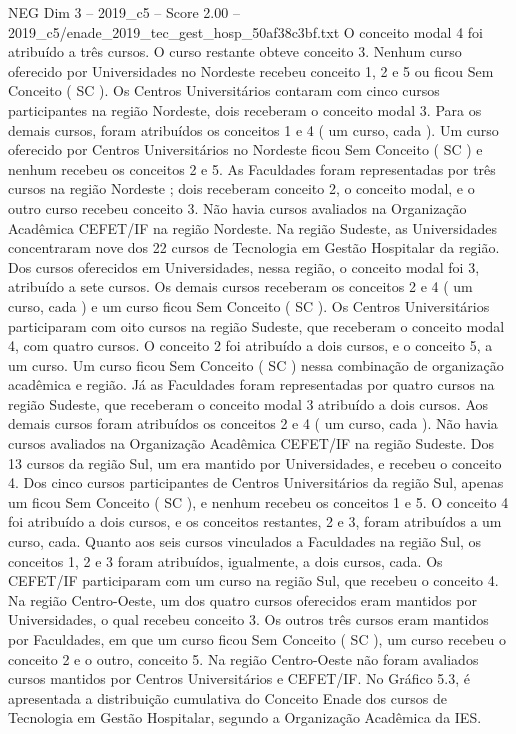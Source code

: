 \begin{textsample}{NEG Dim 3 – 2019\_c5 – Score 2.00 – 2019\_c5/enade\_2019\_tec\_gest\_hosp\_50af38c3bf.txt}
O conceito modal 4 foi atribuído a três cursos.
O curso restante obteve conceito 3.
Nenhum curso oferecido por Universidades no Nordeste recebeu conceito 1, 2 e 5 ou ficou Sem Conceito ( SC ).
Os Centros Universitários contaram com cinco cursos participantes na região Nordeste, dois receberam o conceito modal 3.
Para os demais cursos, foram atribuídos os conceitos 1 e 4 ( um curso, cada ).
Um curso oferecido por Centros Universitários no Nordeste ficou Sem Conceito ( SC ) e nenhum recebeu os conceitos 2 e 5.
As Faculdades foram representadas por três cursos na região Nordeste ; dois receberam conceito 2, o conceito modal, e o outro curso recebeu conceito 3.
Não havia cursos avaliados na Organização Acadêmica CEFET/IF na região Nordeste.
Na região Sudeste, as Universidades concentraram nove dos 22 cursos de Tecnologia em Gestão Hospitalar da região.
Dos cursos oferecidos em Universidades, nessa região, o conceito modal foi 3, atribuído a sete cursos.
Os demais cursos receberam os conceitos 2 e 4 ( um curso, cada ) e um curso ficou Sem Conceito ( SC ).
Os Centros Universitários participaram com oito cursos na região Sudeste, que receberam o conceito modal 4, com quatro cursos.
O conceito 2 foi atribuído a dois cursos, e o conceito 5, a um curso.
Um curso ficou Sem Conceito ( SC ) nessa combinação de organização acadêmica e região.
Já as Faculdades foram representadas por quatro cursos na região Sudeste, que receberam o conceito modal 3 atribuído a dois cursos.
Aos demais cursos foram atribuídos os conceitos 2 e 4 ( um curso, cada ).
Não havia cursos avaliados na Organização Acadêmica CEFET/IF na região Sudeste.
Dos 13 cursos da região Sul, um era mantido por Universidades, e recebeu o conceito 4.
Dos cinco cursos participantes de Centros Universitários da região Sul, apenas um ficou Sem Conceito ( SC ), e nenhum recebeu os conceitos 1 e 5.
O conceito 4 foi atribuído a dois cursos, e os conceitos restantes, 2 e 3, foram atribuídos a um curso, cada.
Quanto aos seis cursos vinculados a Faculdades na região Sul, os conceitos 1, 2 e 3 foram atribuídos, igualmente, a dois cursos, cada.
Os CEFET/IF participaram com um curso na região Sul, que recebeu o conceito 4.
Na região Centro-Oeste, um dos quatro cursos oferecidos eram mantidos por Universidades, o qual recebeu conceito 3.
Os outros três cursos eram mantidos por Faculdades, em que um curso ficou Sem Conceito ( SC ), um curso recebeu o conceito 2 e o outro, conceito 5.
Na região Centro-Oeste não foram avaliados cursos mantidos por Centros Universitários e CEFET/IF.
No Gráfico 5.3, é apresentada a distribuição cumulativa do Conceito Enade dos cursos de Tecnologia em Gestão Hospitalar, segundo a Organização Acadêmica da IES.

\end{textsample}
